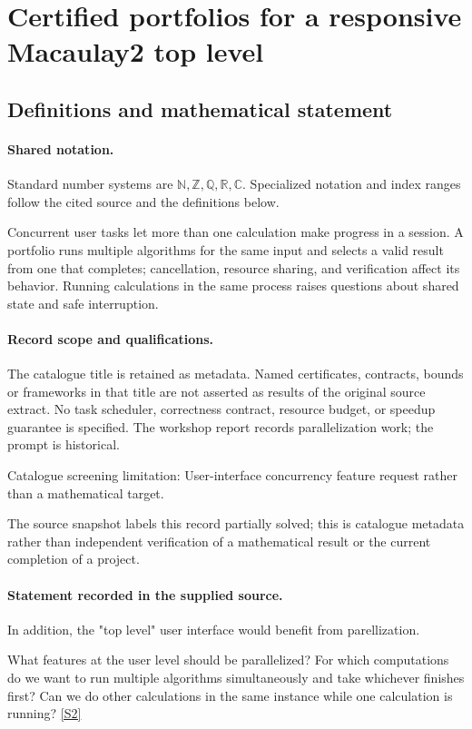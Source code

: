 \documentclass[11pt]{article}
\newcommand{\sref}[2]{\hyperlink{source:#1:#2}{[S#2]}}
\begin{document}
\section{Certified portfolios for a responsive Macaulay2 top level}\label{statement}

\subsection{Definitions and mathematical statement}

\paragraph{Shared notation.}Standard number systems are $\mathbb N,\mathbb Z,\mathbb Q,\mathbb R,\mathbb C$. Specialized notation and index ranges follow the cited source and the definitions below.


Concurrent user tasks let more than one calculation make progress in a session. A portfolio runs multiple algorithms for the same input and selects a valid result from one that completes; cancellation, resource sharing, and verification affect its behavior. Running calculations in the same process raises questions about shared state and safe interruption.
\paragraph{Record scope and qualifications.}
The catalogue title is retained as metadata. Named certificates, contracts, bounds or frameworks in that title are not asserted as results of the original source extract.
No task scheduler, correctness contract, resource budget, or speedup guarantee is specified. The workshop report records parallelization work; the prompt is historical.

Catalogue screening limitation: User-interface concurrency feature request rather than a mathematical target.

The source snapshot labels this record partially solved; this is catalogue metadata rather than independent verification of a mathematical result or the current completion of a project.
\paragraph{Statement recorded in the supplied source.}
In addition, the "top level" user interface would benefit from parellization.

What features at the user level should be parallelized? For which computations do we want to run multiple algorithms simultaneously and take whichever finishes first? Can we do other calculations in the same instance while one calculation is running? \sref{statement}{2}
\end{document}
